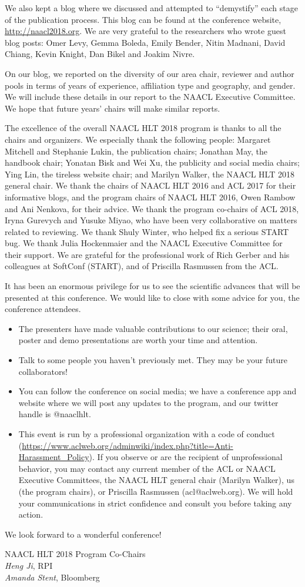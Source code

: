 We also kept a blog where we discussed and attempted to ``demystify'' each stage of the publication process. This blog can be found at the conference website, {\small \url{http://naacl2018.org}}. We are very grateful to the researchers who wrote guest blog posts: Omer Levy, Gemma Boleda, Emily Bender, Nitin Madnani, David Chiang, Kevin Knight, Dan Bikel and Joakim Nivre. 

On our blog, we reported on the diversity of our area chair,  reviewer and author pools in terms of years of experience, affiliation type and geography, and gender. We will include these details in our report to the NAACL Executive Committee. We hope that future years' chairs will make similar reports.

The excellence of the overall NAACL HLT 2018 program is thanks to all the chairs and organizers. We especially thank the following people: Margaret Mitchell and Stephanie Lukin, the publication chairs; Jonathan May, the handbook chair; Yonatan Bisk and Wei Xu, the publicity and social media chairs; Ying Lin, the tireless website chair; and Marilyn Walker, the NAACL HLT 2018 general chair. We thank the chairs of NAACL HLT 2016 and ACL 2017 for their informative blogs, and the program chairs of NAACL HLT 2016, Owen Rambow and Ani Nenkova, for their advice. We thank the program co-chairs of ACL 2018, Iryna Gurevych and Yusuke Miyao, who have been very collaborative on matters related to reviewing. We thank Shuly Winter, who helped fix a serious START bug. We thank Julia Hockenmaier and the NAACL Executive Committee for their support.  We are grateful for the professional work of Rich Gerber and his colleagues at SoftConf (START), and  of Priscilla Rasmussen from the ACL. 

It has been an enormous privilege for us to see the scientific advances that will be presented at this conference. We would like to close with some advice for you, the conference attendees.  %
\begin{itemize}[noitemsep,nolistsep]
\item The presenters have made valuable contributions to our science; their oral, poster and demo presentations are worth your time and attention.
\item Talk to some people you haven't previously met. They may be your   future collaborators!
\item You can follow the conference on social media; we have a conference app and website where we will post any updates to the program, and our twitter handle is @naaclhlt. 
\item This event is run by a professional organization with a code of conduct ({\small \url{https://www.aclweb.org/adminwiki/index.php?title=Anti-Harassment_Policy}}). If you observe or are the recipient of unprofessional behavior, you may contact  any current member of the ACL or NAACL Executive Committees, the NAACL HLT general chair (Marilyn Walker), us (the program chairs), or Priscilla Rasmussen (acl@aclweb.org). We will hold your communications in strict confidence and consult you before taking any action.
\end{itemize}

We look forward to a wonderful conference! 

\vskip 0.5in
\noindent NAACL HLT 2018 Program Co-Chairs \\
{\it Heng Ji}, RPI \\
{\it Amanda Stent}, Bloomberg

